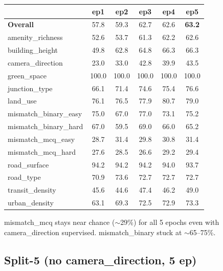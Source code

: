 \documentclass[11pt]{article}
\begin{document}
\begin{table}[h]\centering\scriptsize
\setlength{\tabcolsep}{6pt}
\begin{tabular}{l c c c c c}
\toprule
& ep1 & ep2 & ep3 & ep4 & ep5 \\
\midrule
\textbf{Overall}      & 57.8 & 59.3 & 62.7 & 62.6 & \textbf{63.2} \\
amenity\_richness     & 52.6 & 53.7 & 61.3 & 62.2 & 62.6 \\
building\_height      & 49.8 & 62.8 & 64.8 & 66.3 & 66.3 \\
camera\_direction     & 23.0 & 33.0 & 42.8 & 39.9 & 43.5 \\
green\_space          & 100.0 & 100.0 & 100.0 & 100.0 & 100.0 \\
junction\_type        & 66.1 & 71.4 & 74.6 & 75.4 & 76.6 \\
land\_use             & 76.1 & 76.5 & 77.9 & 80.7 & 79.0 \\
mismatch\_binary\_easy& 75.0 & 67.0 & 77.0 & 73.1 & 75.2 \\
mismatch\_binary\_hard& 67.0 & 59.5 & 69.0 & 66.0 & 65.2 \\
mismatch\_mcq\_easy   & 28.7 & 31.4 & 29.8 & 30.8 & 31.4 \\
mismatch\_mcq\_hard   & 27.6 & 28.5 & 26.6 & 29.2 & 29.4 \\
road\_surface         & 94.2 & 94.2 & 94.2 & 94.0 & 93.7 \\
road\_type            & 70.9 & 73.6 & 72.7 & 72.7 & 72.7 \\
transit\_density      & 45.6 & 44.6 & 47.4 & 46.2 & 49.0 \\
urban\_density        & 63.1 & 69.3 & 72.5 & 72.9 & 73.3 \\
\bottomrule
\end{tabular}
\end{table}

mismatch\_mcq stays near chance ($\sim$29\%) for all 5 epochs even with camera\_direction supervised. mismatch\_binary stuck at $\sim$65--75\%.

\subsection*{Split-5 (no camera\_direction, 5 ep)}
\end{document}
